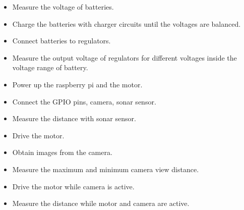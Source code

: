 \begin{itemize}
\item Measure the voltage of batteries.
\item Charge the batteries with charger circuits until the voltages are balanced.
\item Connect batteries to regulators.
\item Measure the output voltage of regulators for different voltages inside the voltage range of battery.
\item Power up the raspberry pi and the motor.
\item Connect the GPIO pins, camera, sonar sensor.
\item Measure the distance with sonar sensor.
\item Drive the motor.
\item Obtain images from the camera.
\item Measure the maximum and minimum camera view distance.
\item Drive the motor while camera is active.
\item Measure the distance while motor and camera are active.
\end{itemize}
